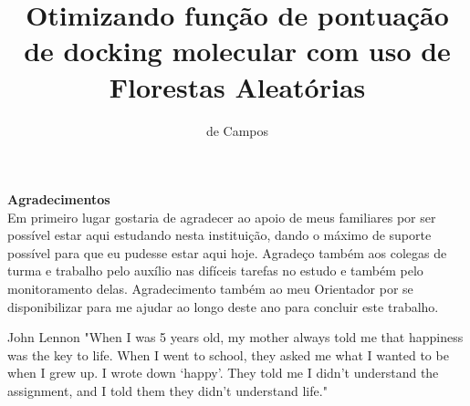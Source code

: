 \documentclass[tcc, capa]{texucpel}
\title{Otimizando função de pontuação de docking molecular com uso de Florestas Aleatórias}
\author{de Campos}{Gianluca}
\begin{document}
\maketitle 
\renewcommand{\advisorname}
{Orientador}          
\sloppy
\fichacatalografica
\folhadeaprovacao

\begin{agradecimentos}
\textbf{Agradecimentos} \\
Em primeiro lugar gostaria de agradecer ao apoio de meus familiares por ser possível estar aqui estudando nesta instituição, dando o máximo de suporte possível para que eu pudesse estar aqui hoje. Agradeço também aos colegas de turma e trabalho pelo auxílio nas difíceis tarefas no estudo e também pelo monitoramento delas. Agradecimento também ao meu Orientador por se disponibilizar para me ajudar ao longo deste ano para concluir este trabalho.
\vspace{\baselineskip}
\end{agradecimentos}


\begin{epigrafe}{John Lennon}
"When I was 5 years old, my mother always told me that happiness was the key to life. When I went to school, they asked me what I wanted to be when I grew up. I wrote down ‘happy’. They told me I didn’t understand the assignment, and I told them they didn’t understand life."\\
\end{epigrafe}

\end{document}

